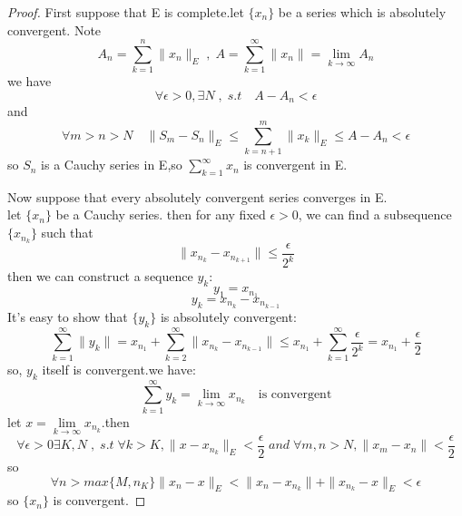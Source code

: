 \documentclass{article}
\begin{document}
\begin{proof}
First suppose that E is complete.let $\{x_n\}$ be a series which is absolutely convergent. Note $$A_n = \sum_{k=1}^{n}\|x_n\|_E \;,\; A = \sum_{k=1}^{\infty}\|x_n\| = \lim\limits_{k \to \infty}A_n$$
we have $$\forall \epsilon > 0 ,\exists N \;,\;s.t \quad A - A_n < \epsilon $$
and $$\forall m > n > N \quad \|S_m - S_n\|_E \leq \sum_{k = n+1}^{m}\|x_k\|_E \leq A - A_n < \epsilon$$
so $S_n$ is a Cauchy series in E,so $\sum_{k=1}^{\infty}x_n$ is convergent in E.

Now suppose that every absolutely convergent series converges in E.\\
let $\{x_n\}$ be a Cauchy series. then for any fixed $\epsilon > 0$, we can find a subsequence $\{x_{n_k}\}$ such that 
$$\|x_{n_k} - x_{n_{k+1}}\| \leq \frac{\epsilon}{2^k} $$ 
then we can construct a sequence $y_k$:
$$ y_1 = x_{n_1}$$
$$y_k = x_{n_k} - x_{n_{k-1}} $$
It's easy to show that $\{y_k\}$ is absolutely convergent:
$$\sum_{k=1}^{\infty}\|y_k\| = x_{n_1} + \sum_{k=2}^{\infty}\|x_{n_k} - x_{n_{k-1}}\| \leq x_{n_1} + \sum_{k=1}^{\infty}\frac{\epsilon}{2^k} = x_{n_1} + \frac{\epsilon}{2}$$
so, $y_k$ itself is convergent.we have:
$$\sum_{k=1}^{\infty}y_k = \lim\limits_{k \to \infty}x_{n_k} \quad \text{is convergent}$$
let $x = \lim\limits_{k \to \infty}x_{n_k}$.then $$\forall \epsilon > 0 \exists K,N \;,\; s.t\; \forall k > K,\|x - x_{n_k}\|_E < \frac{\epsilon}{2} \; and \; \forall m,n>N,\|x_m - x_n\| < \frac{\epsilon}{2}$$
so $$\forall n > max\{M,n_K\} \|x_n - x\|_E < \|x_n - x_{n_k}\| + \|x_{n_k} - x\|_E < \epsilon$$
so $\{x_n\}$ is convergent.
\end{proof}
\end{document}
